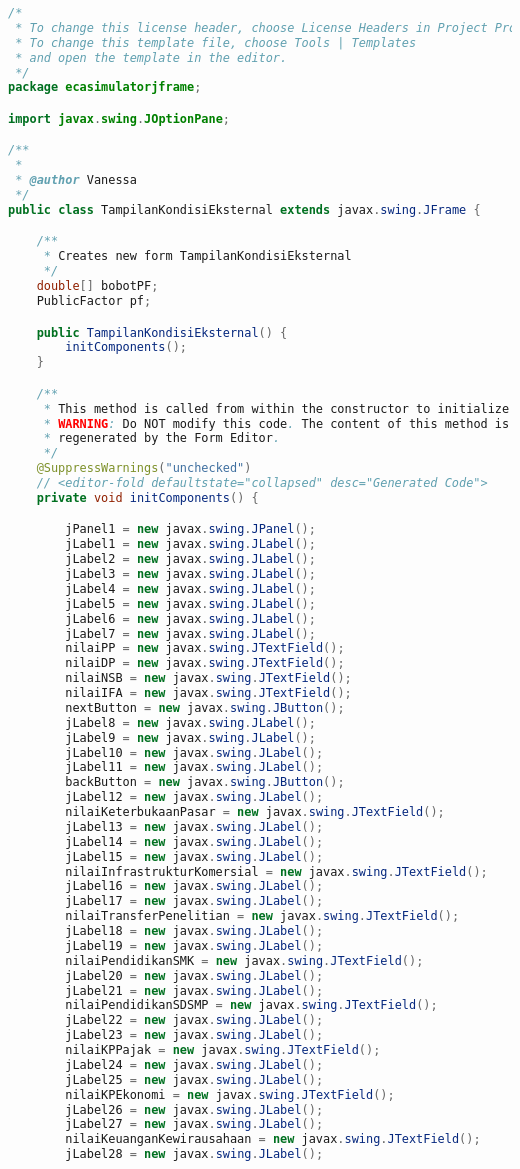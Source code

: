 \begin{lstlisting}[language=Java, caption=TampilanKondisiEksternal.java]
/*
 * To change this license header, choose License Headers in Project Properties.
 * To change this template file, choose Tools | Templates
 * and open the template in the editor.
 */
package ecasimulatorjframe;

import javax.swing.JOptionPane;

/**
 *
 * @author Vanessa
 */
public class TampilanKondisiEksternal extends javax.swing.JFrame {

    /**
     * Creates new form TampilanKondisiEksternal
     */
    double[] bobotPF;
    PublicFactor pf;

    public TampilanKondisiEksternal() {
        initComponents();
    }

    /**
     * This method is called from within the constructor to initialize the form.
     * WARNING: Do NOT modify this code. The content of this method is always
     * regenerated by the Form Editor.
     */
    @SuppressWarnings("unchecked")
    // <editor-fold defaultstate="collapsed" desc="Generated Code">                          
    private void initComponents() {

        jPanel1 = new javax.swing.JPanel();
        jLabel1 = new javax.swing.JLabel();
        jLabel2 = new javax.swing.JLabel();
        jLabel3 = new javax.swing.JLabel();
        jLabel4 = new javax.swing.JLabel();
        jLabel5 = new javax.swing.JLabel();
        jLabel6 = new javax.swing.JLabel();
        jLabel7 = new javax.swing.JLabel();
        nilaiPP = new javax.swing.JTextField();
        nilaiDP = new javax.swing.JTextField();
        nilaiNSB = new javax.swing.JTextField();
        nilaiIFA = new javax.swing.JTextField();
        nextButton = new javax.swing.JButton();
        jLabel8 = new javax.swing.JLabel();
        jLabel9 = new javax.swing.JLabel();
        jLabel10 = new javax.swing.JLabel();
        jLabel11 = new javax.swing.JLabel();
        backButton = new javax.swing.JButton();
        jLabel12 = new javax.swing.JLabel();
        nilaiKeterbukaanPasar = new javax.swing.JTextField();
        jLabel13 = new javax.swing.JLabel();
        jLabel14 = new javax.swing.JLabel();
        jLabel15 = new javax.swing.JLabel();
        nilaiInfrastrukturKomersial = new javax.swing.JTextField();
        jLabel16 = new javax.swing.JLabel();
        jLabel17 = new javax.swing.JLabel();
        nilaiTransferPenelitian = new javax.swing.JTextField();
        jLabel18 = new javax.swing.JLabel();
        jLabel19 = new javax.swing.JLabel();
        nilaiPendidikanSMK = new javax.swing.JTextField();
        jLabel20 = new javax.swing.JLabel();
        jLabel21 = new javax.swing.JLabel();
        nilaiPendidikanSDSMP = new javax.swing.JTextField();
        jLabel22 = new javax.swing.JLabel();
        jLabel23 = new javax.swing.JLabel();
        nilaiKPPajak = new javax.swing.JTextField();
        jLabel24 = new javax.swing.JLabel();
        jLabel25 = new javax.swing.JLabel();
        nilaiKPEkonomi = new javax.swing.JTextField();
        jLabel26 = new javax.swing.JLabel();
        jLabel27 = new javax.swing.JLabel();
        nilaiKeuanganKewirausahaan = new javax.swing.JTextField();
        jLabel28 = new javax.swing.JLabel();


\end{lstlisting}
